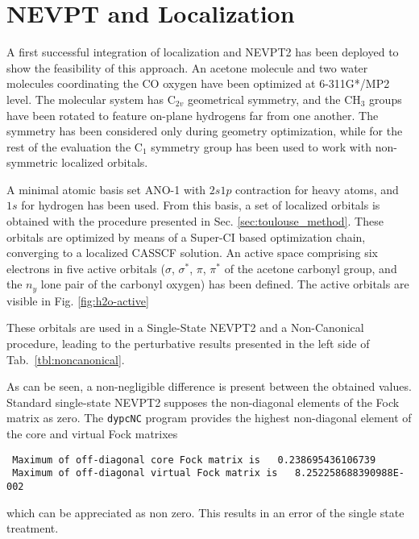 \section{NEVPT and Localization}

A first successful integration of localization and NEVPT2 has been deployed
to show the feasibility of this approach.
An acetone molecule and two water molecules coordinating the CO oxygen have
been optimized at 6-311G*/MP2 level. The molecular system has C$_{2v}$
geometrical symmetry, and the CH$_3$ groups have been rotated to feature
on-plane hydrogens far from one another. The symmetry has been considered
only during geometry optimization, while for the rest of the evaluation the
C$_1$ symmetry group has been used to work with non-symmetric localized
orbitals.

A minimal atomic basis set ANO-1 with $2s1p$ contraction for heavy atoms, and
$1s$ for hydrogen has been used. From this basis, a set of localized orbitals
is obtained with the procedure presented in Sec.
\ref{sec:toulouse_method}. These orbitals are optimized by means of a
Super-CI based optimization chain, converging to a localized CASSCF
solution. An active space comprising six electrons in five
active orbitals ($\sigma$, $\sigma^{*}$, $\pi$, $\pi^{*}$ of the acetone
carbonyl group, and the $n_y$ lone pair of the carbonyl oxygen) has been
defined. The active orbitals are visible in Fig. \ref{fig:h2o-active}



These orbitals are used in a Single-State NEVPT2 and a Non-Canonical
procedure, leading to the perturbative results presented in the left side
of Tab.~\ref{tbl:noncanonical}.  


\vspace{4mm}

As can be seen, a non-negligible difference is present
between the obtained values.  Standard single-state NEVPT2 supposes the
non-diagonal elements of the Fock matrix as zero.  The \texttt{dypcNC}
program provides the highest non-diagonal element of the core and virtual
Fock matrixes

{
\footnotesize
\begin{verbatim}
 Maximum of off-diagonal core Fock matrix is   0.238695436106739
 Maximum of off-diagonal virtual Fock matrix is   8.252258688390988E-002
\end{verbatim}
}
which can be appreciated as non zero. This results in an error of the single
state treatment. 

